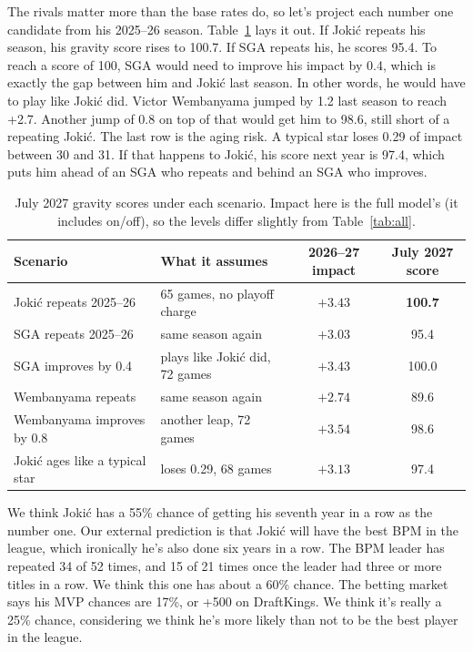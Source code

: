 \documentclass[11pt]{article}
\begin{document}
The rivals matter more than the base rates do, so let's project each number one candidate from
his 2025--26 season. Table~\ref{tab:scen} lays it out. If Jokić repeats his season, his gravity
score rises to 100.7. If SGA repeats his, he scores 95.4. To reach a score of 100, SGA would
need to improve his impact by 0.4, which is exactly the gap between him and Jokić last season.
In other words, he would have to play like Jokić did. Victor Wembanyama jumped by 1.2 last
season to reach +2.7. Another jump of 0.8 on top of that would get him to 98.6, still short of
a repeating Jokić. The last row is the aging risk. A typical star loses 0.29 of impact between
30 and 31. If that happens to Jokić, his score next year is 97.4, which puts him ahead of an
SGA who repeats and behind an SGA who improves.

\begin{table}[h]
\centering\small
\caption{July 2027 gravity scores under each scenario. Impact here is the full model's
(it includes on/off), so the levels differ slightly from Table~\ref{tab:all}.}
\begin{tabular}{llcc}
\toprule
Scenario & What it assumes & 2026--27 impact & July 2027 score \\
\midrule
Jokić repeats 2025--26 & 65 games, no playoff charge & $+3.43$ & \textbf{100.7} \\
SGA repeats 2025--26 & same season again & $+3.03$ & 95.4 \\
SGA improves by 0.4 & plays like Jokić did, 72 games & $+3.43$ & 100.0 \\
Wembanyama repeats & same season again & $+2.74$ & 89.6 \\
Wembanyama improves by 0.8 & another leap, 72 games & $+3.54$ & 98.6 \\
Jokić ages like a typical star & loses 0.29, 68 games & $+3.13$ & 97.4 \\
\bottomrule
\end{tabular}
\label{tab:scen}
\end{table}

We think Jokić has a 55\% chance of getting his seventh year in a row as the \gravity{}
number one. Our external prediction is that Jokić will have the best BPM in the league, which
ironically he's also done six years in a row. The BPM leader has repeated 34 of 52 times, and
15 of 21 times once the leader had three or more titles in a row. We think this one has about a
60\% chance. The betting market says his MVP chances are 17\%, or +500 on DraftKings. We think
it's really a 25\% chance, considering we think he's more likely than not to be the best
player in the league.
\end{document}

